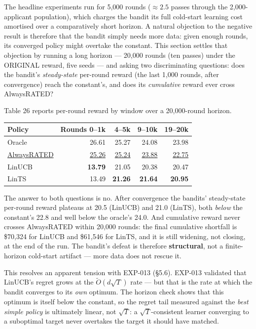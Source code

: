 The headline experiments run for 5,000 rounds (\(\approx 2.5\) passes through the 2,000-applicant population), which charges the bandit its full cold-start learning cost amortised over a comparatively short horizon. A natural objection to the negative result is therefore that the bandit simply needs more data: given enough rounds, its converged policy might overtake the constant. This section settles that objection by running a long horizon --- 20,000 rounds (ten passes) under the ORIGINAL reward, five seeds --- and asking two discriminating questions: does the bandit's \emph{steady-state} per-round reward (the last 1,000 rounds, after convergence) reach the constant's, and does its \emph{cumulative} reward ever cross AlwaysRATED?

Table 26 reports per-round reward by window over a 20,000-round horizon.

\label{tab:5.13.1}

{\def\LTcaptype{none}
\begin{longtable}{@{}lrrrr@{}}
\toprule
Policy & Rounds 0--1k & 4--5k & 9--10k & 19--20k \\
\midrule
\endhead
\bottomrule
\endlastfoot
Oracle & 26.61 & 25.27 & 24.08 & 23.98 \\
\underline{AlwaysRATED} & \underline{25.26} & \underline{25.24} & \underline{23.88} & \underline{22.75} \\
LinUCB & \textbf{13.79} & 21.05 & 20.38 & 20.47 \\
LinTS & 13.49 & \textbf{21.26} & \textbf{21.64} & \textbf{20.95} \\
\end{longtable}
}

The answer to both questions is no. After convergence the bandits' steady-state per-round reward plateaus at 20.5 (LinUCB) and 21.0 (LinTS), both \emph{below} the constant's 22.8 and well below the oracle's 24.0. And cumulative reward never crosses AlwaysRATED within 20,000 rounds: the final cumulative shortfall is \$70,324 for LinUCB and \$61,546 for LinTS, and it is still widening, not closing, at the end of the run. The bandit's defeat is therefore \textbf{structural}, not a finite-horizon cold-start artifact --- more data does not rescue it.

This resolves an apparent tension with EXP-013 (§5.6). EXP-013 validated that LinUCB's regret grows at the \(\tilde O(d\sqrt{T})\) rate --- but that is the rate at which the bandit converges to its \emph{own} optimum. The horizon check shows that this optimum is itself below the constant, so the regret tail measured against the \emph{best simple policy} is ultimately linear, not \(\sqrt{T}\): a \(\sqrt{T}\)-consistent learner converging to a suboptimal target never overtakes the target it should have matched.

